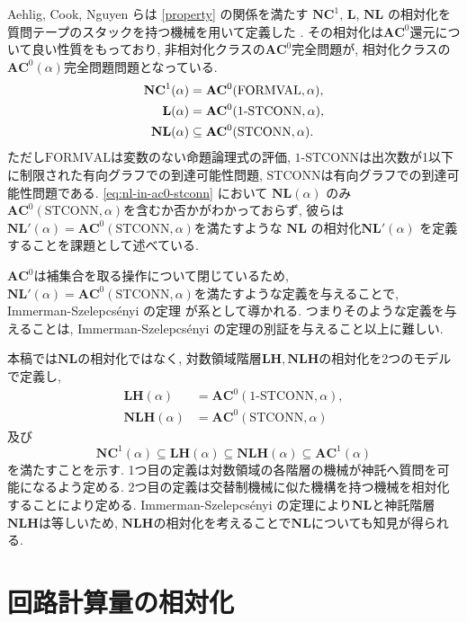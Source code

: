 \documentclass[10pt,a4paper,twocolumn]{jarticle}
\theoremstyle{definition}
\theoremstyle{remark}
\newcommand{\classfont}{\mathbf}
\newcommand{\AC}{\classfont{AC}}
\newcommand{\NC}{\classfont{NC}}
\renewcommand{\L}{\classfont{L}}
\newcommand{\NL}{\classfont{NL}}
\newcommand{\LH}{\classfont{LH}}
\newcommand{\NLH}{\classfont{NLH}}
\newcommand{\probfont}{\text}
\newcommand{\oneSTCONN}{\probfont{1-STCONN}}
\newcommand{\STCONN}{\probfont{STCONN}}
\newcommand{\FORMVAL}{\probfont{FORMVAL}}
\begin{document}
Aehlig, Cook, Nguyen らは \eqref{property} の関係を満たす
$\NC^1$, $\L$, $\NL$ の相対化を質問テープのスタックを持つ機械を用いて定義した
\cite{aehlig2007relativizing}.
その相対化は$\AC^0$還元について良い性質をもっており,
非相対化クラスの$\AC^0$完全問題が,
相対化クラスの$\AC^0(\alpha)$完全問題問題となっている.
\begin{align}
 \NC^1(\alpha) &= \AC^0 (\FORMVAL, \alpha), \notag
 \\
 \L(\alpha) &= \AC^0 (\oneSTCONN, \alpha), \label{eq:nl-in-ac0-stconn}
 \\
 \NL(\alpha) &\subseteq \AC^0(\STCONN, \alpha). \notag
\end{align}
ただし$\FORMVAL$は変数のない命題論理式の評価,
$\oneSTCONN$は出次数が1以下に制限された有向グラフでの到達可能性問題,
$\STCONN$は有向グラフでの到達可能性問題である.
\eqref{eq:nl-in-ac0-stconn} において $\NL(\alpha)$ のみ
$\AC^0(\STCONN, \alpha)$を含むか否かがわかっておらず, 
彼らは $\NL'(\alpha) = \AC^0(\STCONN, \alpha)$を満たすような
$\NL$ の相対化$\NL'(\alpha)$ を定義することを課題として述べている.


$\AC^0$は補集合を取る操作について閉じているため,
$\NL'(\alpha) = \AC^0(\STCONN, \alpha)$を満たすような定義を与えることで,
Immerman-Szelepcs{\'e}nyi の定理 
\cite{immerman1988nondeterministic,szelepcsenyi1988method}
が系として導かれる.
つまりそのような定義を与えることは,
Immerman-Szelepcs{\'e}nyi の定理の別証を与えること以上に難しい.


本稿では$\NL$の相対化ではなく,
対数領域階層$\LH, \NLH$の相対化を2つのモデルで定義し,
\begin{align*}
 \LH(\alpha) &= \AC^0 (\oneSTCONN, \alpha),
 \\
 \NLH(\alpha) &= \AC^0(\STCONN, \alpha)
\end{align*}
及び
\begin{equation*}
 \NC^1(\alpha) \subseteq \LH(\alpha) \subseteq \NLH(\alpha) \subseteq \AC^1(\alpha)
\end{equation*}
を満たすことを示す.
1つ目の定義は対数領域の各階層の機械が神託へ質問を可能になるよう定める.
2つ目の定義は交替制機械に似た機構を持つ機械を相対化することにより定める.
Immerman-Szelepcs{\'e}nyi の定理により$\NL$と神託階層$\NLH$は等しいため,
$\NLH$の相対化を考えることで$\NL$についても知見が得られる.

\section{回路計算量の相対化}
\end{document}
